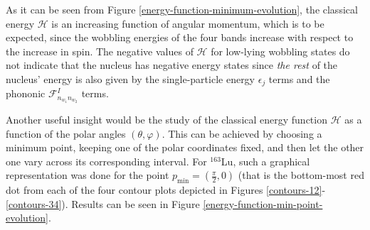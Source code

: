 \documentclass[myclassdoc,debug]{rjparticle}
\begin{document}
As it can be seen from Figure \ref{energy-function-minimum-evolution}, the classical energy $\mathcal{H}$ is an increasing function of angular momentum, which is to be expected, since the wobbling energies of the four bands increase with respect to the increase in spin. The negative values of $\mathcal{H}$ for low-lying wobbling states do not indicate that the nucleus has negative energy states since \emph{the rest} of the nucleus' energy is also given by the single-particle energy $\epsilon_j$ terms and the phononic $\mathcal{F}_{n_{w_1}n_{w_2}}^I$ terms.

Another useful insight would be the study of the classical energy function $\mathcal{H}$ as a function of the polar angles $(\theta,\varphi)$. This can be achieved by choosing a minimum point, keeping one of the polar coordinates fixed, and then let the other one vary across its corresponding interval. For $^{163}$Lu, such a graphical representation was done for the point $p_\text{min}=\left(\frac{\pi}{2},0\right)$ (that is the bottom-most red dot from each of the four contour plots depicted in Figures \ref{contours-12}-\ref{contours-34}). Results can be seen in Figure \ref{energy-function-min-point-evolution}.
\end{document}
